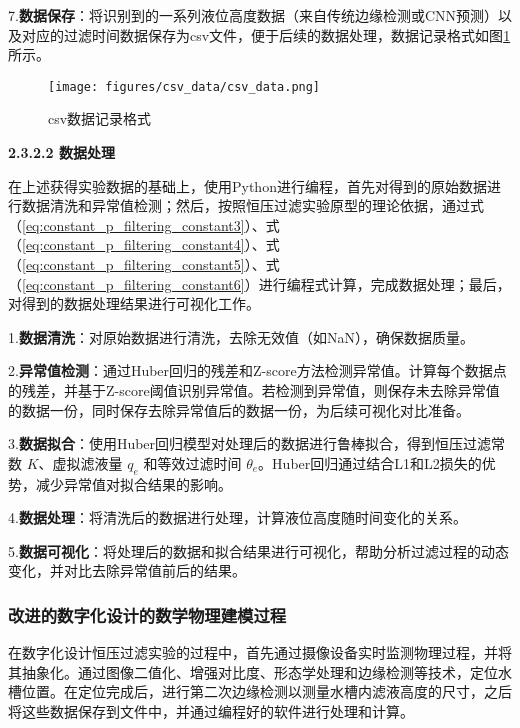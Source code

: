 7.\textbf{数据保存}：将识别到的一系列液位高度数据（来自传统边缘检测或CNN预测）以及对应的过滤时间数据保存为csv文件，便于后续的数据处理，数据记录格式如图\ref{fig:csv_data}所示。

\begin{figure}[H]
    \centering
    \texttt{[image: figures/csv\_data/csv\_data.png]}
    \caption{csv数据记录格式}
    \label{fig:csv_data}
\end{figure}

{\noindent \wuhao \rmfamily {} \textbf{2.3.2.2 \quad 数据处理}}


在上述获得实验数据的基础上，使用Python进行编程，首先对得到的原始数据进行数据清洗和异常值检测；然后，按照恒压过滤实验原型的理论依据，通过式（\ref{eq:constant_p_filtering_constant3}）、式（\ref{eq:constant_p_filtering_constant4}）、式（\ref{eq:constant_p_filtering_constant5}）、式（\ref{eq:constant_p_filtering_constant6}）进行编程式计算，完成数据处理；最后，对得到的数据处理结果进行可视化工作。

1.\textbf{数据清洗}：对原始数据进行清洗，去除无效值（如NaN），确保数据质量。

2.\textbf{异常值检测}：通过Huber回归的残差和Z-score方法检测异常值。计算每个数据点的残差，并基于Z-score阈值识别异常值。若检测到异常值，则保存未去除异常值的数据一份，同时保存去除异常值后的数据一份，为后续可视化对比准备。

3.\textbf{数据拟合}：使用Huber回归模型对处理后的数据进行鲁棒拟合，得到恒压过滤常数 \(K\)、虚拟滤液量 \(q_e\) 和等效过滤时间 \(\theta_e\)。Huber回归通过结合L1和L2损失的优势，减少异常值对拟合结果的影响。

4.\textbf{数据处理}：将清洗后的数据进行处理，计算液位高度随时间变化的关系。

5.\textbf{数据可视化}：将处理后的数据和拟合结果进行可视化，帮助分析过滤过程的动态变化，并对比去除异常值前后的结果。

\subsubsection{改进的数字化设计的数学物理建模过程}

在数字化设计恒压过滤实验的过程中，首先通过摄像设备实时监测物理过程，并将其抽象化。通过图像二值化、增强对比度、形态学处理和边缘检测等技术，定位水槽位置。在定位完成后，进行第二次边缘检测以测量水槽内滤液高度的尺寸，之后将这些数据保存到文件中，并通过编程好的软件进行处理和计算。

